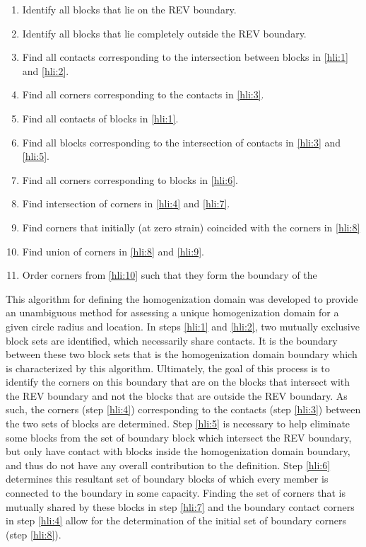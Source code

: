 \begin{enumerate}
\item \label{hli:1} Identify all blocks that lie on the REV boundary. 
\item \label{hli:2} Identify all blocks that lie completely outside the
REV boundary. 
\item \label{hli:3} Find all contacts corresponding to the intersection
between blocks in \ref{hli:1} and \ref{hli:2}. 
\item \label{hli:4} Find all corners corresponding to the contacts in \ref{hli:3}. 
\item \label{hli:5} Find all contacts of blocks in \ref{hli:1}. 
\item \label{hli:6} Find all blocks corresponding to the intersection of
contacts in \ref{hli:3} and \ref{hli:5}. 
\item \label{hli:7} Find all corners corresponding to blocks in \ref{hli:6}. 
\item \label{hli:8} Find intersection of corners in \ref{hli:4} and \ref{hli:7}. 
\item \label{hli:9} Find corners that initially (at zero strain) coincided
with the corners in \ref{hli:8} 
\item \label{hli:10} Find union of corners in \ref{hli:8} and \ref{hli:9}. 
\item \label{hli:11} Order corners from \ref{hli:10} such that they form
the boundary of the 
\end{enumerate}
This algorithm for defining the homogenization domain was developed
to provide an unambiguous method for assessing a unique homogenization
domain for a given circle radius and location. In steps \ref{hli:1}
and \ref{hli:2}, two mutually exclusive block sets are identified,
which necessarily share contacts. It is the boundary between these
two block sets that is the homogenization domain boundary which is
characterized by this algorithm. Ultimately, the goal of this process
is to identify the corners on this boundary that are on the blocks
that intersect with the REV boundary and not the blocks that are outside
the REV boundary. As such, the corners (step \ref{hli:4}) corresponding
to the contacts (step \ref{hli:3}) between the two sets of blocks
are determined. Step \ref{hli:5} is necessary to help eliminate some
blocks from the set of boundary block which intersect the REV boundary,
but only have contact with blocks inside the homogenization domain
boundary, and thus do not have any overall contribution to the definition.
Step \ref{hli:6} determines this resultant set of boundary blocks
of which every member is connected to the boundary in some capacity.
Finding the set of corners that is mutually shared by these blocks
in step \ref{hli:7} and the boundary contact corners in step \ref{hli:4}
allow for the determination of the initial set of boundary corners
(step \ref{hli:8}).

